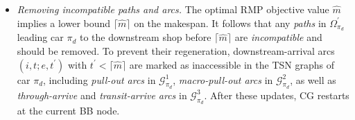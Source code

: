 \documentclass[12pt]{article}
\begin{document}
\begin{itemize}
    \item \textit{Removing incompatible \textit{paths} and arcs.} The optimal RMP objective value $\widehat{m}$ implies a lower bound $\lceil \widehat{m}\rceil$ on the makespan. It follows that any \textit{paths} in $\Omega^{\prime}_{\pi_d}$ leading car $\pi_d$ to the downstream shop before $\lceil \widehat{m}\rceil$ are \textit{incompatible} and should be removed. To prevent their regeneration, downstream-arrival arcs $(i,t;e,t^{\prime})$ with $t^{\prime}<\lceil \widehat{m}\rceil$ are marked as inaccessible in the TSN graphs of car $\pi_d$, including \textit{pull-out arcs} in $\mathcal{G}^1_{\pi_d}$, \textit{macro-pull-out arcs} in $\mathcal{G}^2_{\pi_d}$, as well as \textit{through-arrive} and \textit{transit-arrive arcs} in $\mathcal{G}^3_{\pi_d}$. After these updates, CG restarts at the current BB node.


\end{itemize}
\end{document}
